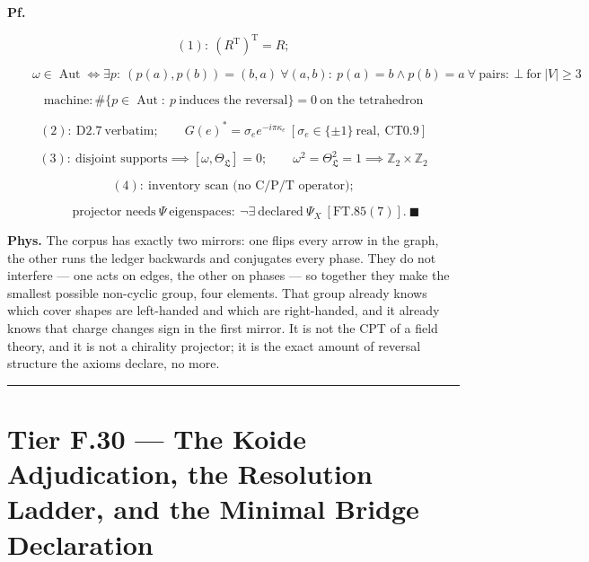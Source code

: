 \begin{theorem}
\textbf{Pf.}

\[
(1):\ (R^{\mathrm T})^{\mathrm T}=R;
\]

\[
\qquad \omega\in\operatorname{Aut}\iff\exists p:\ (p(a),p(b))=(b,a)\ \forall(a,b):\ p(a)=b\wedge p(b)=a\ \forall\ \text{pairs}:\ \bot\ \text{for}\ |V|\ge3
\]

\[
\text{machine}: \#\{p\in\operatorname{Aut}:\ p\ \text{induces the reversal}\}=0\ \text{on the tetrahedron}
\]

\[
(2):\ \mathrm{D2.7}\ \text{verbatim};\qquad G(e)^\ast=\sigma_e e^{-i\pi\kappa_e}\ [\sigma_e\in\{\pm1\}\ \text{real},\ \mathrm{CT0.9}]
\]

\[
(3):\ \text{disjoint supports}\implies[\omega,\Theta_{\mathfrak L}]=0;\qquad\omega^2=\Theta_{\mathfrak L}^2=1\implies\mathbb Z_2\times\mathbb Z_2
\]

\[
(4):\ \text{inventory scan (no C/P/T operator)};
\]

\[
\qquad \text{projector needs}\ \Psi\ \text{eigenspaces}:\ \neg\exists\ \text{declared}\ \Psi_X\ [\mathrm{FT.85}(7)].\ \blacksquare
\]

\textbf{Phys.} The corpus has exactly two mirrors: one flips every arrow in the graph, the other runs the ledger backwards and conjugates every phase. They do not interfere — one acts on edges, the other on phases — so together they make the smallest possible non-cyclic group, four elements. That group already knows which cover shapes are left-handed and which are right-handed, and it already knows that charge changes sign in the first mirror. It is not the CPT of a field theory, and it is not a chirality projector; it is the exact amount of reversal structure the axioms declare, no more.

\vspace{2pt}\noindent\rule{\textwidth}{0.4pt}\vspace{2pt}

\end{theorem}

\section[Tier F.30 — The Koide Adjudication, the Resolution Ladder,…]{\texorpdfstring{Tier F.30 — The Koide Adjudication, the Resolution Ladder, and the Minimal Bridge Declaration}{Tier F.30 - The Koide Adjudication, the Resolution Ladder, and the Minimal Bridge Declaration}}

